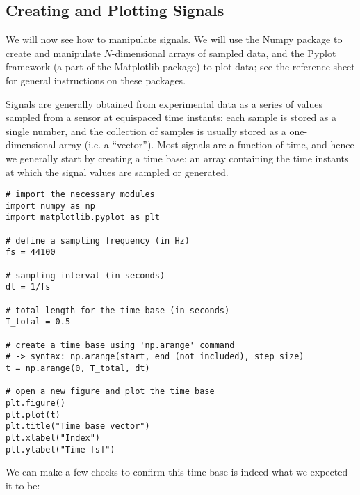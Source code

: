 \subsection{Creating and Plotting Signals}

We will now see how to manipulate signals. We will use the Numpy package to create and manipulate $N$-dimensional arrays of sampled data, and the Pyplot framework (a part of the Matplotlib package) to plot data; see the reference sheet for general instructions on these packages.

Signals are generally obtained from experimental data as a series of values sampled from a sensor at equispaced time instants; each sample is stored as a single number, and the collection of samples is usually stored as a one-dimensional array (i.e. a ``vector''). Most signals are a function of time, and hence we generally start by creating a time base: an array containing the time instants at which the signal values are sampled or generated.

\begin{lstlisting}[frame=single]
# import the necessary modules
import numpy as np
import matplotlib.pyplot as plt

# define a sampling frequency (in Hz)
fs = 44100

# sampling interval (in seconds)
dt = 1/fs

# total length for the time base (in seconds)
T_total = 0.5

# create a time base using 'np.arange' command
# -> syntax: np.arange(start, end (not included), step_size)
t = np.arange(0, T_total, dt)

# open a new figure and plot the time base
plt.figure()
plt.plot(t)
plt.title("Time base vector")
plt.xlabel("Index")
plt.ylabel("Time [s]")
\end{lstlisting}

We can make a few checks to confirm this time base is indeed what we expected it to be:

